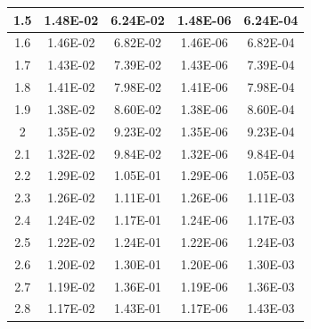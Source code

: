 \documentclass[11pt, a4paper, twocolumn]{article}
\begin{document}
\begin{longtable}[c]{|
>{\columncolor[HTML]{EFEFEF}}c |c|c|c|c|}
1.5                & 1.48E-02                       & 6.24E-02                       & 1.48E-06                   & 6.24E-04                   \\ \hline
1.6                & 1.46E-02                       & 6.82E-02                       & 1.46E-06                   & 6.82E-04                   \\ \hline
1.7                & 1.43E-02                       & 7.39E-02                       & 1.43E-06                   & 7.39E-04                   \\ \hline
1.8                & 1.41E-02                       & 7.98E-02                       & 1.41E-06                   & 7.98E-04                   \\ \hline
1.9                & 1.38E-02                       & 8.60E-02                       & 1.38E-06                   & 8.60E-04                   \\ \hline
2                  & 1.35E-02                       & 9.23E-02                       & 1.35E-06                   & 9.23E-04                   \\ \hline
2.1                & 1.32E-02                       & 9.84E-02                       & 1.32E-06                   & 9.84E-04                   \\ \hline
2.2                & 1.29E-02                       & 1.05E-01                       & 1.29E-06                   & 1.05E-03                   \\ \hline
2.3                & 1.26E-02                       & 1.11E-01                       & 1.26E-06                   & 1.11E-03                   \\ \hline
2.4                & 1.24E-02                       & 1.17E-01                       & 1.24E-06                   & 1.17E-03                   \\ \hline
2.5                & 1.22E-02                       & 1.24E-01                       & 1.22E-06                   & 1.24E-03                   \\ \hline
2.6                & 1.20E-02                       & 1.30E-01                       & 1.20E-06                   & 1.30E-03                   \\ \hline
2.7                & 1.19E-02                       & 1.36E-01                       & 1.19E-06                   & 1.36E-03                   \\ \hline
2.8                & 1.17E-02                       & 1.43E-01                       & 1.17E-06                   & 1.43E-03                   \\ \hline

\end{longtable}
\end{document}
